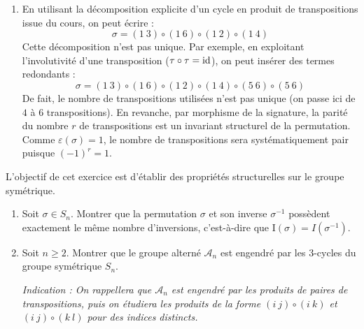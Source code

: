 \documentclass[12pt, a4paper]{report}
\begin{document}
\begin{enumerate}
    \item En utilisant la décomposition explicite d'un cycle en produit de transpositions issue du cours, on peut écrire :
    $$\sigma = (1 \ 3) \circ (1 \ 6) \circ (1 \ 2) \circ (1 \ 4)$$
    Cette décomposition n'est pas unique. Par exemple, en exploitant l'involutivité d'une transposition ($\tau \circ \tau = \mathrm{id}$), on peut insérer des termes redondants :
    $$\sigma = (1 \ 3) \circ (1 \ 6) \circ (1 \ 2) \circ (1 \ 4) \circ (5 \ 6) \circ (5 \ 6)$$
    De fait, le nombre de transpositions utilisées n'est pas unique (on passe ici de $4$ à $6$ transpositions). En revanche, par morphisme de la signature, la parité du nombre $r$ de transpositions est un invariant structurel de la permutation. Comme $\varepsilon(\sigma) = 1$, le nombre de transpositions sera systématiquement pair puisque $(-1)^r = 1$.
\end{enumerate}

\begin{exercise}
    L'objectif de cet exercice est d'établir des propriétés structurelles sur le groupe symétrique.
    \begin{enumerate}
        \item Soit $\sigma \in S_n$. Montrer que la permutation $\sigma$ et son inverse $\sigma^{-1}$ possèdent exactement le même nombre d'inversions, c'est-à-dire que $\mathrm{I}(\sigma) = I(\sigma^{-1})$.
        \item Soit $n \ge 2$. Montrer que le groupe alterné $\mathcal{A}_n$ est engendré par les $3$-cycles du groupe symétrique $S_n$.
        
        \textit{Indication : On rappellera que $\mathcal{A}_n$ est engendré par les produits de paires de transpositions, puis on étudiera les produits de la forme $(i \ j) \circ (i \ k)$ et $(i \ j) \circ (k \ l)$ pour des indices distincts.}
    \end{enumerate}
\end{exercise}
\end{document}

